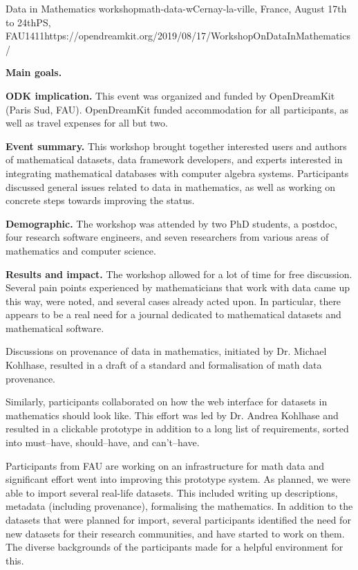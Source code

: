 \begin{event}{Data in Mathematics workshop}{math-data-w}{Cernay-la-ville, France, August 17th to 24th}{PS, FAU}{14}{11}{https://opendreamkit.org/2019/08/17/WorkshopOnDataInMathematics/}

\textbf{Main goals.} 

\textbf{ODK implication.} This event was organized and funded by OpenDreamKit (Paris Sud, FAU). 
OpenDreamKit funded accommodation for all participants, as well as travel expenses for all but two.

\textbf{Event summary.} This workshop brought together interested users and authors of mathematical datasets, 
data framework developers, and experts interested in integrating mathematical databases with computer algebra systems.
Participants discussed general issues related to data in mathematics,
as well as working on concrete steps towards improving the status.

\textbf{Demographic.} The workshop was attended by 
two PhD students,
a postdoc,
four research software engineers,
and seven researchers from various areas of mathematics and computer science.

\textbf{Results and impact.} 
The workshop allowed for a lot of time for free discussion.
Several pain points experienced by mathematicians that work with data came up this way,
were noted, and several cases already acted upon.
In particular, there appears to be a real need for a journal dedicated to 
mathematical datasets and mathematical software.

Discussions on provenance of data in mathematics,
initiated by Dr. Michael Kohlhase, resulted in 
a draft of a standard and formalisation of math data provenance.

Similarly, participants collaborated on how the web interface
for datasets in mathematics should look like.
This effort was led by Dr. Andrea Kohlhase and resulted in 
a clickable prototype in addition to a long list of requirements,
sorted into must--have, should--have, and can't--have.

Participants from FAU are working on an infrastructure for math data and
significant effort went into improving this prototype system.
As planned, we were able to import several real-life datasets.
This included writing up descriptions, metadata (including provenance), 
formalising the mathematics.
In addition to the datasets that were planned for import,
several participants identified the need for new datasets for their 
research communities, and have started to work on them.
The diverse backgrounds of the participants made for a helpful
environment for this.


\end{event}
